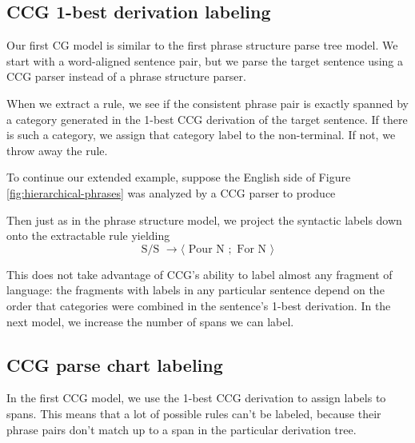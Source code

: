 \documentclass{article}
\begin{document}
\subsection{CCG 1-best derivation labeling}

Our first CG model is similar to the first phrase structure parse tree model. We start with a word-aligned sentence pair, but we parse the target sentence using a CCG parser instead of a phrase structure parser.

When we extract a rule, we see if the consistent phrase pair is exactly spanned by a category generated in the 1-best CCG derivation of the target sentence. If there is such a category, we assign that category label to the non-terminal. If not, we throw away the rule.

To continue our extended example, suppose the English side of Figure \ref{fig:hierarchical-phrases} was analyzed by a CCG parser to produce
\begin{center}
\end{center}
Then just as in the phrase structure model, we project the syntactic labels down onto the extractable rule yielding
\begin{equation}
\textrm{S/S } \to \langle \textrm{ Pour N }; \textrm{ For N } \rangle
\end{equation}

This does not take advantage of CCG's ability to label almost any fragment of language: the fragments with labels in any particular sentence depend on the order that categories were combined in the sentence's 1-best derivation. In the next model, we increase the number of spans we can label.

\subsection{CCG parse chart labeling}

In the first CCG model, we use the 1-best CCG derivation to assign labels to spans. This means that a lot of possible rules can't be labeled, because their phrase pairs don't match up to a span in the particular derivation tree.
\end{document}
